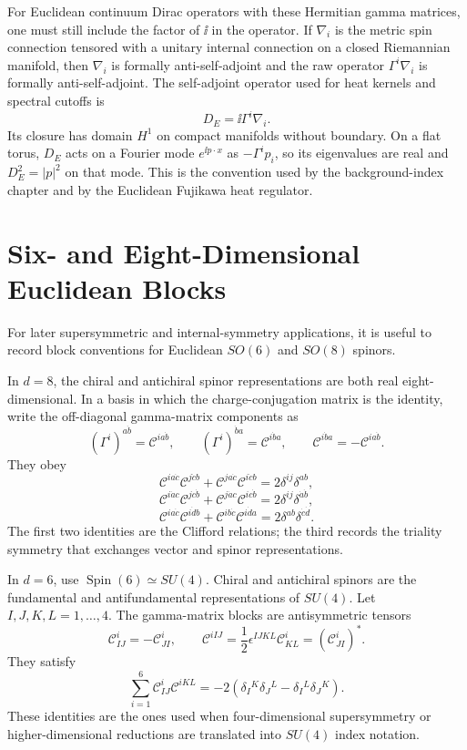 For Euclidean continuum Dirac operators with these Hermitian gamma matrices,
one must still include the factor of \(\ii\) in the operator.  If
\(\nabla_i\) is the metric spin connection tensored with a unitary internal
connection on a closed Riemannian manifold, then \(\nabla_i\) is formally
anti-self-adjoint and the raw operator \(\Gamma^i\nabla_i\) is formally
anti-self-adjoint.  The self-adjoint operator used for heat kernels and
spectral cutoffs is
\[
  D_E=\ii\Gamma^i\nabla_i .
\]
Its closure has domain \(H^1\) on compact manifolds without boundary.  On a
flat torus, \(D_E\) acts on a Fourier mode \(e^{\ii p\cdot x}\) as
\(-\Gamma^i p_i\), so its eigenvalues are real and \(D_E^2=|p|^2\) on that
mode.  This is the convention used by the background-index chapter and by the
Euclidean Fujikawa heat regulator.

\section{Six- and Eight-Dimensional Euclidean Blocks}

\begin{definition}
\label{def:six-eight-dimensional-euclidean-spinor-blocks}
For later supersymmetric and internal-symmetry applications, it is useful to
record block conventions for Euclidean \(SO(6)\) and \(SO(8)\) spinors.

In \(d=8\), the chiral and antichiral spinor representations are both real
eight-dimensional.  In a basis in which the charge-conjugation matrix is the
identity, write the off-diagonal gamma-matrix components as
\[
  (\Gamma^i)^{a\dot b}=\mathcal C^{i a\dot b},
  \qquad
  (\Gamma^i)^{\dot b a}=\mathcal C^{i\dot b a},
  \qquad
  \mathcal C^{i\dot b a}=-\mathcal C^{i a\dot b}.
\]
They obey
\[
  \mathcal C^{i a\dot c}\mathcal C^{j\dot c b}
  +
  \mathcal C^{j a\dot c}\mathcal C^{i\dot c b}
  =
  2\delta^{ij}\delta^{ab},
\]
\[
  \mathcal C^{i\dot a c}\mathcal C^{j c\dot b}
  +
  \mathcal C^{j\dot a c}\mathcal C^{i c\dot b}
  =
  2\delta^{ij}\delta^{\dot a\dot b},
\]
\[
  \mathcal C^{i a\dot c}\mathcal C^{i\dot d b}
  +
  \mathcal C^{i b\dot c}\mathcal C^{i\dot d a}
  =
  2\delta^{ab}\delta^{\dot c\dot d}.
\]
The first two identities are the Clifford relations; the third records the
triality symmetry that exchanges vector and spinor representations.

In \(d=6\), use \(\operatorname{Spin}(6)\simeq SU(4)\).  Chiral and
antichiral spinors are the fundamental and antifundamental representations
of \(SU(4)\).  Let \(I,J,K,L=1,\ldots,4\).  The gamma-matrix blocks are
antisymmetric tensors
\[
  \mathcal C^i_{IJ}=-\mathcal C^i_{JI},
  \qquad
  \mathcal C^{iIJ}
  =
  \frac12\epsilon^{IJKL}\mathcal C^i_{KL}
  =
  \left(\mathcal C^i_{JI}\right)^* .
\]
They satisfy
\[
  \sum_{i=1}^6
  \mathcal C^i_{IJ}\mathcal C^{iKL}
  =
  -2
  \left(\delta_I{}^K\delta_J{}^L-\delta_I{}^L\delta_J{}^K\right).
\]
These identities are the ones used when four-dimensional supersymmetry or
higher-dimensional reductions are translated into \(SU(4)\) index notation.
\end{definition}
